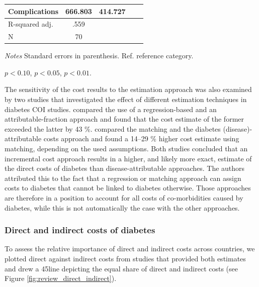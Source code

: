 \begin{table}[p]
\begin{center}
\begin{adjustbox}{max width=\linewidth}
\begin{threeparttable}
{\begin{tabular}{l*{2}{SS}}
                Complications & 666.803 & 414.727 \\
\midrule
                R-squared adj. & .559 &  \\
                N & 70 &  \\ 
 \bottomrule
\end{tabular}
\begin{tablenotes}
\item \textit{Notes} Standard errors in parenthesis. Ref. reference category.
\item \sym{*} \(p<0.10\), \sym{**} \(p<0.05\), \sym{***} \(p<0.01\).
\end{tablenotes}
}
\end{threeparttable}
\end{adjustbox}
\end{center}
\end{table}

The sensitivity of the cost results to the estimation approach was also examined by two studies that investigated the effect of different estimation techniques in diabetes \ac{COI} studies. \textcite{Honeycutt2009a} compared the use of a regression-based and an attributable-fraction approach and found that the cost estimate of the former exceeded the latter by 43 \%. \textcite{Tunceli2010c} compared the matching and the diabetes (disease)-attributable costs approach and found a 14--29 \% higher cost estimate using matching, depending on the used assumptions. Both studies concluded that an incremental cost approach results in a higher, and likely more exact, estimate of the direct costs of diabetes than disease-attributable approaches. The authors attributed this to the fact that a regression or matching approach can assign costs to diabetes that cannot be linked to diabetes otherwise. Those approaches are therefore in a position to account for all costs of co-morbidities caused by diabetes, while this is not automatically the case with the other approaches.

\subsubsection*{Direct and indirect costs of diabetes}

To assess the relative importance of direct and indirect costs across countries, we plotted direct against indirect costs from studies that provided both estimates and drew a 45\degree line depicting the equal share of direct and indirect costs (see Figure \ref{fig:review_direct_indirect}).

